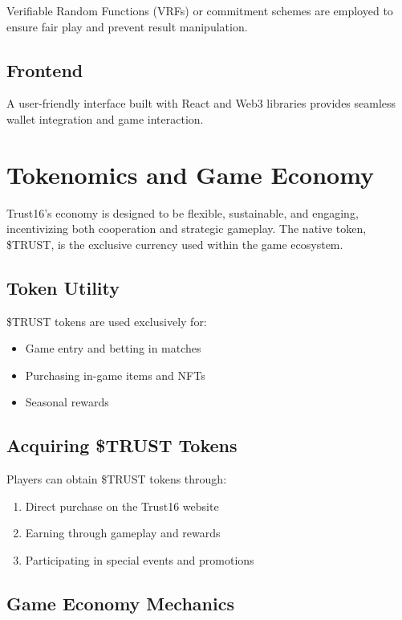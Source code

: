 \documentclass[]{article}
\begin{document}
Verifiable Random Functions (VRFs) or commitment schemes are employed to ensure fair play and prevent result manipulation.

\subsection{Frontend}

A user-friendly interface built with React and Web3 libraries provides seamless wallet integration and game interaction.

\section{Tokenomics and Game Economy}

Trust16's economy is designed to be flexible, sustainable, and engaging, incentivizing both cooperation and strategic gameplay. The native token, \$TRUST, is the exclusive currency used within the game ecosystem.

\subsection{Token Utility}

\$TRUST tokens are used exclusively for:
\begin{itemize}
\item Game entry and betting in matches
\item Purchasing in-game items and NFTs
\item Seasonal rewards
\end{itemize}

\subsection{Acquiring \$TRUST Tokens}

Players can obtain \$TRUST tokens through:
\begin{enumerate}
\item Direct purchase on the Trust16 website
\item Earning through gameplay and rewards
\item Participating in special events and promotions
\end{enumerate}

\subsection{Game Economy Mechanics}
\end{document}
